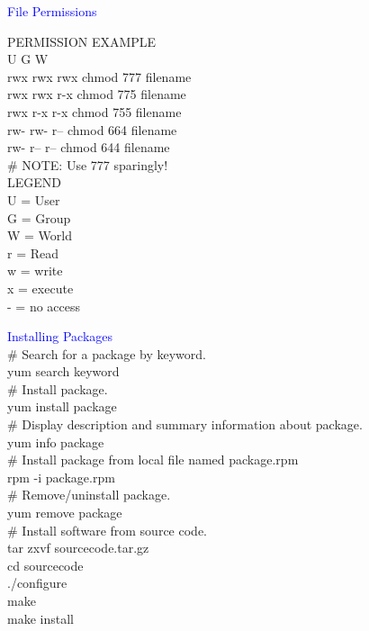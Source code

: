 \documentclass{article}
\begin{document}
\textcolor{blue}{File Permissions  }\\
\noindent
\begin{center}
\end{center}
PERMISSION      EXAMPLE\\
U   G   W\\
        rwx rwx rwx     chmod 777 filename\\
        rwx rwx r-x     chmod 775 filename\\
        rwx r-x r-x     chmod 755 filename\\
        rw- rw- r--     chmod 664 filename\\
        rw- r-- r--     chmod 644 filename\\
\# NOTE: Use 777 sparingly!\\
LEGEND\\
U = User\\
G = Group\\
W = World\\
r = Read\\
w = write\\
x = execute\\
- = no access\\

\textcolor{blue}{Installing Packages }\\
\noindent
\# Search for a package by keyword.\\
yum search keyword\\
\# Install package.\\
yum install package\\
\# Display description and summary information about package.\\
yum info package\\
\# Install package from local file named package.rpm\\
rpm -i package.rpm\\
\# Remove/uninstall package.\\
yum remove package\\
\# Install software from source code.\\
tar zxvf sourcecode.tar.gz\\
cd sourcecode\\
./configure\\
make\\
make install\\
\end{document}
